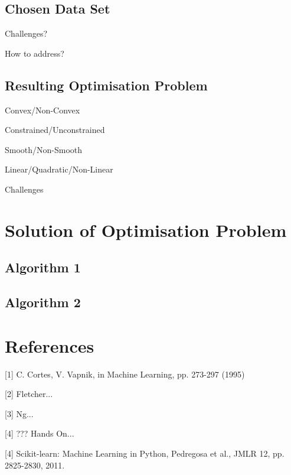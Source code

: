 \documentclass[10pt, a4paper]{amsart}
\begin{document}
\subsection{Chosen Data Set}\hfill



Challenges?

How to address?

\subsection{Resulting Optimisation Problem}\hfill

Convex/Non-Convex

Constrained/Unconstrained

Smooth/Non-Smooth

Linear/Quadratic/Non-Linear

Challenges


\section{Solution of Optimisation Problem}

\subsection{Algorithm 1}\hfill

\subsection{Algorithm 2}\hfill


\section{References}

[1] C. Cortes, V. Vapnik, in Machine Learning, pp. 273-297 (1995)

[2] Fletcher...

[3] Ng...

[4] ??? Hands On...

[4] Scikit-learn: Machine Learning in Python, Pedregosa et al., JMLR 12, pp. 2825-2830, 2011.
\end{document}
